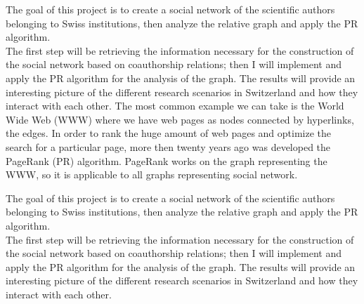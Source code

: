 \documentclass[12 pt]{article}
\begin{document}
The goal of this project is to create a social network of the scientific authors belonging to Swiss institutions, then analyze the relative graph and apply the PR algorithm.\\
The first step will be retrieving the information necessary for the construction of the social network based on coauthorship relations; then I will implement and apply the PR algorithm for the analysis of the graph.
The results will provide an interesting picture of the different research scenarios in Switzerland and how they interact with each other.
The most common example we can take is the World Wide Web (WWW) where we have web pages as nodes connected by hyperlinks, the edges. In order to rank the huge amount of web pages and optimize the search for a particular page, more then twenty years ago was developed the PageRank (PR) algorithm. PageRank works on the graph representing the WWW, so it is applicable to all graphs representing social network.

The goal of this project is to create a social network of the scientific authors belonging to Swiss institutions, then analyze the relative graph and apply the PR algorithm.\\
The first step will be retrieving the information necessary for the construction of the social network based on coauthorship relations; then I will implement and apply the PR algorithm for the analysis of the graph.
The results will provide an interesting picture of the different research scenarios in Switzerland and how they interact with each other.
\end{document}
